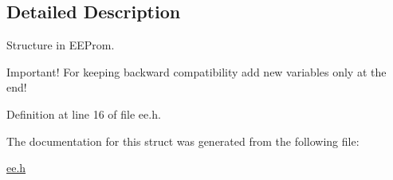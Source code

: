 \subsection{Detailed Description}
Structure in EEProm. 

Important! For keeping backward compatibility add new variables only at the end! 

Definition at line 16 of file ee.h.

The documentation for this struct was generated from the following file:\begin{CompactItemize}
\item 
\hyperlink{ee_8h}{ee.h}\end{CompactItemize}
